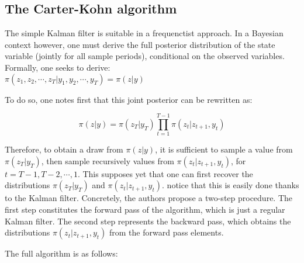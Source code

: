 \subsection{The Carter-Kohn algorithm}
\label{appendix3_subsection2}

The simple Kalman filter is suitable in a frequenctist approach. In a Bayesian context however, one must derive the full posterior distribution of the state variable (jointly for all sample periods), conditional on the observed variables. Formally, one seeks to derive: \\
$\pi(z_1, z_2, \cdots, z_T | y_1, y_2, \cdots, y_T) = \pi(z|y)$

To do so, one notes first that this joint posterior can be rewritten as:

\begin{equation}
\pi(z|y)=\pi(z_T|y_T) \prod\limits_{t=1}^{T-1}{\pi(z_t| z_{t+1}, y_t)}
\nonumber \end{equation}

\newpage

Therefore, to obtain a draw from $\pi(z|y)$, it is sufficient to sample a value from $\pi(z_T|y_T)$, then sample recursively values from $\pi(z_t| z_{t+1}, y_t)$, for $t = T-1, T-2, \cdots, 1$. This supposes yet that one can first recover the distributions $\pi(z_T|y_T)$ and $\pi(z_t| z_{t+1}, y_t)$. \cite{Carter1994} notice that this is easily done thanks to the Kalman filter. Concretely, the authors propose a two-step procedure. The first step constitutes the forward pass of the algorithm, which is just a regular Kalman filter. The second step represents the backward pass, which obtains the distributions $\pi(z_t| z_{t+1}, y_t)$ from the forward pass elements.

The full algorithm is as follows:


